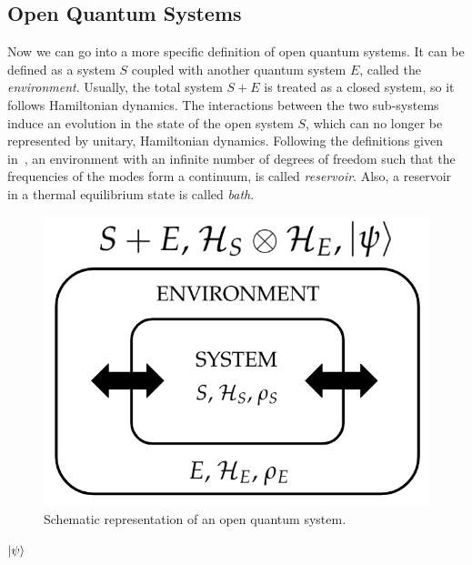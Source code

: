\subsection{Open Quantum Systems}
Now we can go into a more specific definition of open quantum systems. It can be defined as a system $S$ coupled with another quantum system $E$, called the \emph{environment}. Usually, the total system $S+E$ is treated as a closed system, so it follows Hamiltonian dynamics. The interactions between the two sub-systems induce an evolution in the state of the open system $S$, which can no longer be represented by unitary, Hamiltonian dynamics. Following the definitions given in~\cite{pet_breuer:open_quantum}, an environment with an infinite number of degrees of freedom such that the frequencies of the modes form a continuum, is called \emph{reservoir}. Also, a reservoir in a thermal equilibrium state is called \emph{bath}.

\begin{figure}
    \centering
    \includegraphics[scale=0.5]{Figures/openSystems_sketch.png}
    \caption{Schematic representation of an open quantum system.}
    \label{fig:openSystems_sketch}
\end{figure}

$\ket{\psi}$

